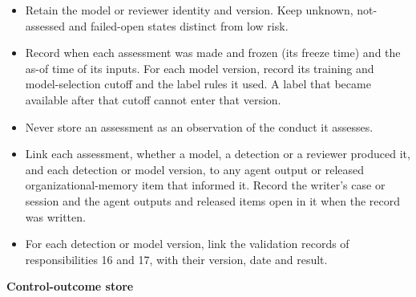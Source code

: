 \documentclass[
  11pt,
]{article}
\providecommand{\tightlist}{%
  \setlength{\itemsep}{0pt}\setlength{\parskip}{0pt}}
\renewcommand{\tightlist}{\setlength{\itemsep}{0pt plus 1pt}\setlength{\parskip}{0pt}}
\begin{document}
\begin{itemize}
\tightlist
\item
  Retain the model or reviewer identity and version. Keep unknown,
  not-assessed and failed-open states distinct from low risk.
\item
  Record when each assessment was made and frozen (its freeze time) and
  the as-of time of its inputs. For each model version, record its
  training and model-selection cutoff and the label rules it used. A
  label that became available after that cutoff cannot enter that
  version.
\item
  Never store an assessment as an observation of the conduct it
  assesses.
\item
  Link each assessment, whether a model, a detection or a reviewer
  produced it, and each detection or model version, to any agent output
  or released organizational-memory item that informed it. Record the
  writer's case or session and the agent outputs and released items open
  in it when the record was written.
\item
  For each detection or model version, link the validation records of
  responsibilities 16 and 17, with their version, date and result.
\end{itemize}


\textbf{Control-outcome store}
\end{document}

